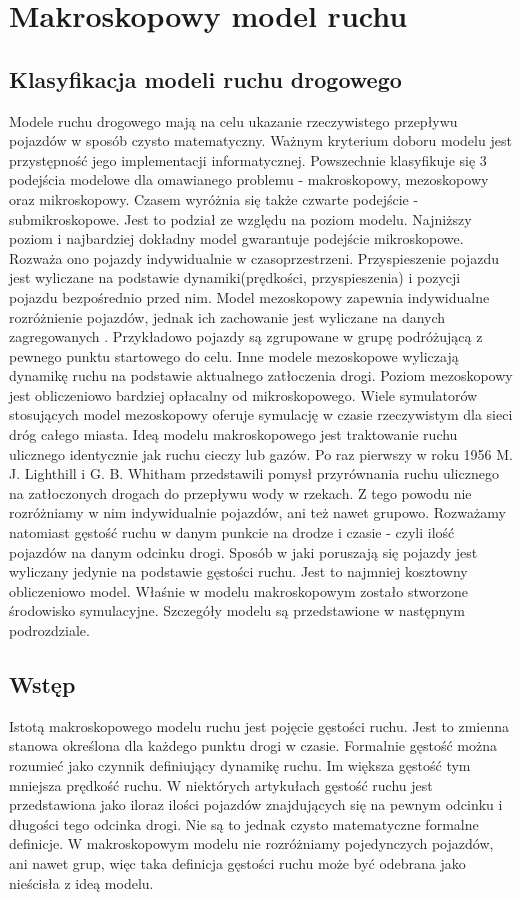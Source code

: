 \documentclass[12pt]{book}
\theoremstyle{plain}
\begin{document}
\chapter{Makroskopowy model ruchu}
\section{Klasyfikacja modeli ruchu drogowego}
Modele ruchu drogowego mają na celu ukazanie rzeczywistego przepływu pojazdów w sposób czysto matematyczny. Ważnym kryterium doboru modelu jest przystępność jego implementacji informatycznej. Powszechnie klasyfikuje się 3 podejścia modelowe dla omawianego problemu \cite{CompareModels} - makroskopowy, mezoskopowy oraz mikroskopowy. Czasem \cite{multilevel} wyróżnia się także czwarte podejście - submikroskopowe. Jest to podział ze względu na poziom modelu. Najniższy poziom i najbardziej dokładny model gwarantuje podejście mikroskopowe. Rozważa ono pojazdy indywidualnie w czasoprzestrzeni. Przyspieszenie pojazdu jest wyliczane na podstawie dynamiki(prędkości, przyspieszenia) i pozycji pojazdu bezpośrednio przed nim. Model mezoskopowy zapewnia indywidualne rozróżnienie pojazdów, jednak ich zachowanie jest wyliczane na danych zagregowanych \cite{mesoscopic}. Przykładowo pojazdy są zgrupowane w grupę podróżującą z pewnego punktu startowego do celu. Inne modele \cite{mesoscopic2} mezoskopowe wyliczają dynamikę ruchu na podstawie aktualnego zatłoczenia drogi. Poziom mezoskopowy jest obliczeniowo bardziej opłacalny od mikroskopowego.
Wiele symulatorów stosujących model mezoskopowy oferuje symulację w czasie rzeczywistym dla sieci dróg całego miasta\cite{vu2017high}. Ideą modelu makroskopowego jest traktowanie ruchu ulicznego identycznie jak ruchu cieczy lub gazów. Po raz pierwszy w roku 1956 M. J. Lighthill i G. B. Whitham \cite{lwr} przedstawili pomysł przyrównania ruchu ulicznego na zatłoczonych drogach do przepływu wody w rzekach. Z tego powodu nie rozróżniamy w nim indywidualnie pojazdów, ani też nawet grupowo. Rozważamy natomiast gęstość ruchu w danym punkcie na drodze i czasie - czyli ilość pojazdów na danym odcinku drogi. Sposób w jaki poruszają się pojazdy jest wyliczany jedynie na podstawie gęstości ruchu. Jest to najmniej kosztowny obliczeniowo model. Właśnie w modelu makroskopowym zostało stworzone środowisko symulacyjne. Szczegóły modelu są przedstawione w następnym podrozdziale.

\section{Wstęp}
Istotą makroskopowego modelu ruchu jest pojęcie gęstości ruchu. Jest to zmienna stanowa określona dla każdego punktu drogi w czasie. Formalnie gęstość można rozumieć jako czynnik definiujący dynamikę ruchu. Im większa gęstość tym mniejsza prędkość ruchu. W niektórych artykułach gęstość ruchu \cite{helbing2001master} jest przedstawiona jako iloraz ilości pojazdów znajdujących się na pewnym odcinku i długości tego odcinka drogi. Nie są to jednak czysto matematyczne formalne definicje. W makroskopowym modelu nie rozróżniamy pojedynczych pojazdów, ani nawet grup, więc taka definicja gęstości ruchu może być odebrana jako nieścisła z ideą modelu. 
\end{document}
